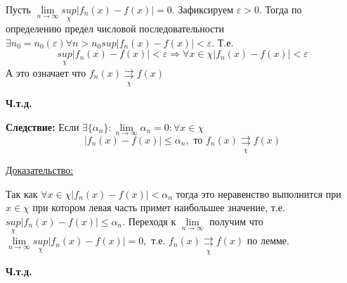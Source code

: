 \documentclass[12pt]{article}
\newcommand*\circled[1]{\tikz[baseline=(char.base)]{
    \node[shape=circle, draw, inner sep=1pt, 
        minimum height=12pt] (char) {#1};}}
\let\oldlim\lim
\renewcommand{\lim}{\oldlim\limits}
\begin{document}
  \begin{adjustwidth}{1.5em}{1.5em}
    \circled{$\Leftarrow$} Пусть $\lim_{n \to \infty} \underset{\chi}{sup} |f_n(x)-f(x)|=0$. Зафиксируем
    $\varepsilon>0$. Тогда по определению предел числовой последовательности $\exists n_0 =n_0(\varepsilon)
    \forall n>n_0 sup |f_n(x)-f(x)|<\varepsilon$. Т.е. 
    \[\underset{\chi}{sup}|f_n(x)-f(x)|<\varepsilon \Rightarrow \forall x \in \chi |f_n(x) -f(x)|<\varepsilon\]
    А это означает что $f_n(x) \underset{\chi}{\rightrightarrows} f(x)$
  \end{adjustwidth}
  \begin{center}
    \textbf{Ч.т.д.}
  \end{center}

  \textbf{Следствие:} Если $\exists \{\alpha_n\}: \lim_{n \to \infty} \alpha_n =0:\forall x \in \chi$\\
  \[|f_n(x)-f(x)|\leq \alpha_n, \text{ то } f_n(x) \underset{\chi}{\rightrightarrows} f(x)\]

  \underline{Доказательство:}
  \begin{adjustwidth}{1.5em}{1.5em}
    Так как $\forall x \in \chi |f_n(x)-f(x)|<\alpha_n$ тогда это неравенство выполнится при $ x \in \chi$
    при котором левая часть примет наибольшее значение, т.е. $\underset{\chi}{sup} |f_n(x)-f(x)|\leq \alpha_n$.
    Переходя к $\lim_{n \to \infty}$ получим что $\lim_{n \to \infty} \underset{\chi}{sup}|f_n(x)-f(x)|=0,$
    т.е. $f_n(x)\underset{\chi}{\rightrightarrows} f(x)$ по лемме.
  \end{adjustwidth}

  \begin{center}
    \textbf{Ч.т.д.}
  \end{center}
\end{document}
